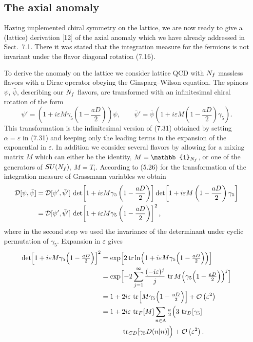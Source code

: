 \subsection{The axial anomaly}

Having implemented chiral symmetry on the lattice, we are now ready to give a
(lattice) derivation [12] of the axial anomaly which we have already addressed
in Sect.~7.1. There it was stated that the integration measure for the fermions
is not invariant under the flavor diagonal rotation (7.16).

To derive the anomaly on the lattice we consider lattice QCD with $N_f$
massless flavors with a Dirac operator obeying the Ginsparg--Wilson equation.
The spinors $\psi$, $\bar\psi$, describing our $N_f$ flavors, are transformed
with an infinitesimal chiral rotation of the form
\begin{equation}
  \psi' = \left(1 + i\varepsilon M\gamma_5\left(1-\frac{aD}{2}\right)\right)\psi,
  \qquad
  \bar\psi' = \bar\psi\left(1 + i\varepsilon M\left(1-\frac{aD}{2}\right)\gamma_5\right).
\end{equation}
This transformation is the infinitesimal version of (7.31) obtained by setting
$\alpha = \varepsilon$ in (7.31) and keeping only the leading terms in the
expansion of the exponential in $\varepsilon$. In addition we consider several
flavors by allowing for a mixing matrix $M$ which can either be the identity,
$M = \mathbb{1}_{\Nf}$, or one of the generators of $SU(N_f)$, $M = T_i$.
According to (5.26) for the transformation of the integration measure of
Grassmann variables we obtain
\begin{align}
  \mathcal{D}[\psi,\bar\psi] &= \mathcal{D}[\psi',\bar\psi']\,
  \det\!\left[1 + i\varepsilon M\gamma_5\left(1-\frac{aD}{2}\right)\right]
  \det\!\left[1 + i\varepsilon M\left(1-\frac{aD}{2}\right)\gamma_5\right] \notag\\
  &= \mathcal{D}[\psi',\bar\psi']\,
  \det\!\left[1 + i\varepsilon M\gamma_5\left(1-\frac{aD}{2}\right)\right]^2,
\end{align}
where in the second step we used the invariance of the determinant under cyclic
permutation of $\gamma_5$. Expansion in $\varepsilon$ gives
\begin{align}
  \det\Bigl[1 + i\varepsilon M\gamma_5\Bigl(1-\tfrac{aD}{2}\Bigr)\Bigr]^2
  &= \exp\Bigl[2\operatorname{tr}\ln\Bigl(1 + i\varepsilon M\gamma_5\Bigl(1-\tfrac{aD}{2}\Bigr)\Bigr)\Bigr] \notag\\
  &= \exp\Bigl[-2\sum_{j=1}^\infty \frac{(-i\varepsilon)^j}{j}\,
     \operatorname{tr} M\Bigl(\gamma_5\Bigl(1-\tfrac{aD}{2}\Bigr)\Bigr)^j\Bigr] \notag\\
  &= 1 + 2i\varepsilon\,\operatorname{tr}\Bigl[M\gamma_5\Bigl(1-\tfrac{aD}{2}\Bigr)\Bigr] + \mathcal{O}\left(\varepsilon^2\right) \notag\\
  &= 1 + 2i\varepsilon\,\operatorname{tr}_F[M]\sum_{n\in\Lambda}\tfrac{a}{2}\Bigl(3\,\operatorname{tr}_D[\gamma_5] \notag\\
  &\qquad - \operatorname{tr}_{CD}[\gamma_5 D(n|n)]\Bigr) + \mathcal{O}\left(\varepsilon^2\right).
\end{align}
